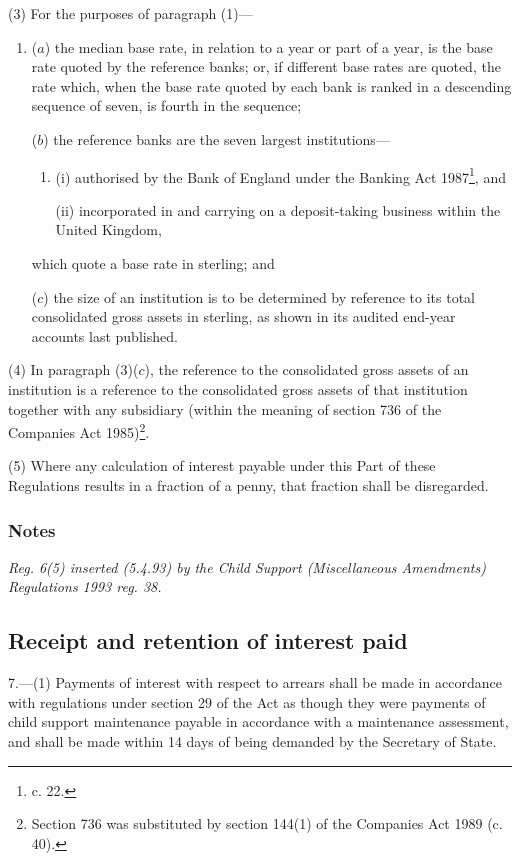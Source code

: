 \documentclass[a4paper]{article}
\newcommand\amendment[1]{\subsubsection*{Notes}{\itshape\frenchspacing\footnotesize #1 \par}}
\begin{document}
(3) For the purposes of paragraph (1)—
\begin{enumerate}\item[]
($a$) the median base rate, in relation to a year or part of a year, is the base rate quoted by the reference banks; or, if different base rates are quoted, the rate which, when the base rate quoted by each bank is ranked in a descending sequence of seven, is fourth in the sequence;

($b$) the reference banks are the seven largest institutions—
\begin{enumerate}\item[]
(i) authorised by the Bank of England under the Banking Act 1987\footnote{ c. 22.}, and

(ii) incorporated in and carrying on a deposit-taking business within the United Kingdom,
\end{enumerate}
which quote a base rate in sterling; and

($c$) the size of an institution is to be determined by reference to its total consolidated gross assets in sterling, as shown in its audited end-year accounts last published.
\end{enumerate}

(4) In paragraph (3)($c$), the reference to the consolidated gross assets of an institution is a reference to the consolidated gross assets of that institution together with any subsidiary (within the meaning of section 736 of the Companies Act 1985)\footnote{\frenchspacing Section 736 was substituted by section 144(1) of the Companies Act 1989 (c. 40).}.

(5) Where any calculation of interest payable under this Part of these Regulations results in a fraction of a penny, that fraction shall be disregarded.

\amendment{
Reg. 6(5) inserted (5.4.93) by the Child Support (Miscellaneous Amendments) Regulations 1993 reg. 38.

}

\subsection[7. Receipt and retention of interest paid]{Receipt and retention of interest paid}

7.—(1) Payments of interest with respect to arrears shall be made in accordance with regulations under section 29 of the Act as though they were payments of child support maintenance payable in accordance with a maintenance assessment, and shall be made within 14 days of being demanded by the Secretary of State.
\end{document}
